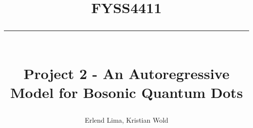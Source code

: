 \newcommand{\horrule}[1]{\rule{\linewidth}{#1}} %

\title{
\large \textsc{FYSS4411} \\ [25pt]
\horrule{0.5pt} \\[0.4cm]
\huge Project 2 - An Autoregressive Model for Bosonic Quantum Dots}

\author{Erlend Lima, Kristian Wold}

